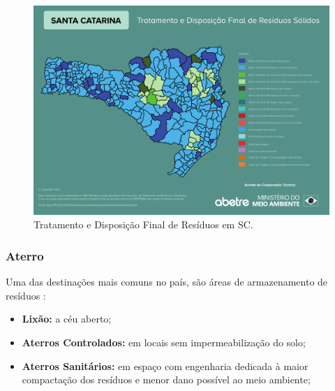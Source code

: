 \begin{figure}[H]
	\caption{\label{fig:Fig_1} Tratamento e Disposição Final de Resíduos em SC.}
	\begin{center}
		\includegraphics[scale=0.50]{images/abetre_sc.pdf}
	\end{center}
\end{figure}

\subsubsection{Aterro}

Uma das destinações mais comuns no país, são áreas de armazenamento de resíduos \cite{diagnostico_cristine}:
\begin{itemize} 
	\item \textbf{Lixão:} a céu aberto;
	\item \textbf{Aterros Controlados:} em locais sem impermeabilização do solo;
	\item \textbf{Aterros Sanitários:} em espaço com engenharia dedicada à maior compactação dos resíduos e menor dano possível ao meio ambiente;
\end{itemize}
